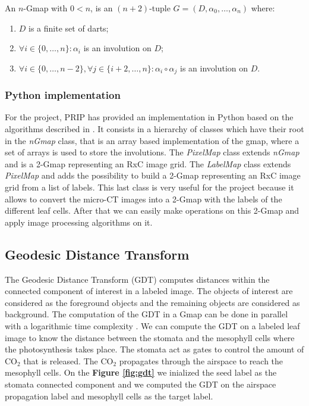 \begin{definition}[$n$-Gmap]
    An $n$-Gmap with $0<n$, is an $(n+2)$-tuple $G=(D,\alpha_0,\ldots,\alpha_{n})$ where:
    \begin{enumerate}
        \item $D$ is a finite set of darts;
        \item $\forall i\in\{0,\ldots,n\}:\alpha_i$ is an involution on $D$;
        \item $\forall i\in\{0,\ldots,n-2\},\forall j\in\{i+2,\ldots,n\}:
        \alpha_i \circ \alpha_j$ is an involution on $D$.
    \end{enumerate}
    \label{definition:gmap}
\end{definition}

\subsubsection{Python implementation}

For the project, PRIP has provided an implementation in Python based on the algorithms 
described in \cite{Lienhardt}. It consists in a hierarchy of classes which have their
root in the \textit{nGmap} class, that is an array based implementation of the
gmap, where a set of arrays is used to store the involutions. The \textit{PixelMap} class 
extends \textit{nGmap} and is a 2-Gmap representing an RxC image grid. The 
\textit{LabelMap} class extends \textit{PixelMap} and adds the possibility to build a 
2-Gmap representing an RxC image grid from a list of labels. This last class is very
useful for the project because it allows to convert the micro-CT images into a 2-Gmap
with the labels of the different leaf cells. After that we can easily make operations
on this 2-Gmap and apply image processing algorithms on it.

\subsection{Geodesic Distance Transform}

The Geodesic Distance Transform (GDT) computes distances within the connected
component of interest in a labeled image. The objects of interest are considered as
the foreground objects and the remaining objects are considered as background.
The computation of the GDT in a Gmap can be done in parallel with a logarithmic
time complexity \cite{Banaeyan}. We can compute the GDT on a labeled leaf image
to know the distance between the stomata and the mesophyll cells where the 
photosynthesis takes place. The stomata act as gates to control the amount of
$\mathrm{CO_2}$ that is released. The $\mathrm{CO_2}$ propagates through the
airspace to reach the mesophyll cells. On the \textbf{Figure \ref{fig:gdt}} we inialized
the seed label as the stomata connected component and we computed the GDT
on the airspace propagation label and mesophyll cells as the target label.

